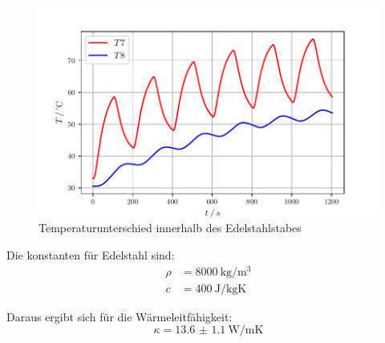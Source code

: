 \begin{figure}
    \centering
    \includegraphics[width=\textwidth]{data/T7T8.pdf}
    \caption{Temperaturunterschied innerhalb des Edelstahlstabes}
    \label{fig:t7t8}
\end{figure}

Die konstanten für Edelstahl sind:
\begin{align*}
    \rho& = 8000\:\si{\kilo\gram\per\meter\cubed} \\
    c& = 400\:\si{\joule\per\kilo\gram\kelvin}
\end{align*}

Daraus ergibt sich für die Wärmeleitfähigkeit:
\begin{equation*}
    \kappa = \SI{13.6(11)}{\watt\per\meter\kelvin}
\end{equation*}









%
